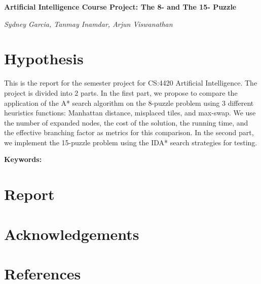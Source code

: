 \documentclass{article}
\begin{document}
	\begin{center}
		\Large \textbf{Artificial Intelligence Course Project: The 8- and The 15- Puzzle}
	\end{center}
	\begin{center}
		\textit{Sydney Garcia, Tanmay Inamdar, Arjun Viswanathan}
	\end{center}

	\section{Hypothesis}
		This is the report for the semester project for CS:4420 Artificial Intelligence. The project is divided into 2 parts. In the first part, we propose to compare the application of the A* search algorithm on the 8-puzzle problem using 3 different heuristics functions: Manhattan distance, misplaced tiles, and max-swap. We use the number of expanded nodes, the cost of the solution, the running time, and the effective branching factor as metrics for this comparison. In the second part, we implement the 15-puzzle problem using the IDA* search strategies for testing. \par 
		
		\textbf{Keywords: } \linebreak
		
	\section{Report}
	
	\section{Acknowledgements}
	
	\section{References}
\end{document}

